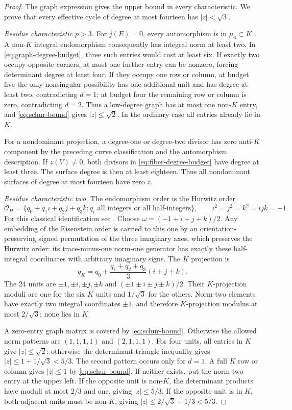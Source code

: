 \begin{proof}
The graph expression gives the upper bound in every characteristic.  We prove that every effective cycle of degree at most fourteen has $|z|<\sqrt3$.

\emph{Residue characteristic $p>3$.}
For $j(E)=0$, every automorphism is in $\mu_6\subset K$ \cite[Proposition IV.7.13]{MilneEC}.  A non-$K$ integral endomorphism consequently has integral norm at least two.  In \eqref{eq:graph-degree-budget}, three such entries would cost at least six.  If exactly two occupy opposite corners, at most one further entry can be nonzero, forcing determinant degree at least four.  If they occupy one row or column, at budget five the only nonsingular possibility has one additional unit and has degree at least two, contradicting $d=1$; at budget four the remaining row or column is zero, contradicting $d=2$.  Thus a low-degree graph has at most one non-$K$ entry, and \eqref{eq:schur-bound} gives $|z|\leq\sqrt2$.  In the ordinary case all entries already lie in $K$.

For a nondominant projection, a degree-one or degree-two divisor has zero anti-$K$ component by the preceding curve classification and the automorphism description.  If $z(V)\ne0$, both divisors in \eqref{eq:fiber-degree-budget} have degree at least three.  The surface degree is then at least eighteen.  Thus all nondominant surfaces of degree at most fourteen have zero $z$.

\emph{Residue characteristic two.}
The endomorphism order is the Hurwitz order
\[
 \mathcal O_H=\{q_0+q_1i+q_2j+q_3k:
  q_i\text{ all integers or all half-integers}\},
 \qquad i^2=j^2=k^2=ijk=-1.
\]
For this classical identification see \cite[footnote 2]{CHVW2022}.
Choose $\omega=(-1+i+j+k)/2$.  Any embedding of the Eisenstein order is carried to this one by an orientation-preserving signed permutation of the three imaginary axes, which preserves the Hurwitz order: its trace-minus-one norm-one generator has exactly these half-integral coordinates with arbitrary imaginary signs.  The $K$ projection is
\[
 q_K=q_0+\frac{q_1+q_2+q_3}{3}(i+j+k).
\]
The 24 units are $\pm1,\pm i,\pm j,\pm k$ and $(\pm1\pm i\pm j\pm k)/2$.  Their $K$-projection moduli are one for the six $K$ units and $1/\sqrt3$ for the others.  Norm-two elements have exactly two integral coordinates $\pm1$, and therefore $K$-projection modulus at most $2/\sqrt3$; none lies in $K$.

A zero-entry graph matrix is covered by \eqref{eq:schur-bound}.  Otherwise the allowed norm patterns are $(1,1,1,1)$ and $(2,1,1,1)$.  For four units, all entries in $K$ give $|z|\leq\sqrt2$; otherwise the determinant triangle inequality gives $|z|\leq1+1/\sqrt3<5/3$.
The second pattern occurs only for $d=1$.  A full $K$ row or column gives $|z|\leq1$ by \eqref{eq:schur-bound}.  If neither exists, put the norm-two entry at the upper left.  If the opposite unit is non-$K$, the determinant products have moduli at most $2/3$ and one, giving $|z|\leq5/3$.  If the opposite unit is in $K$, both adjacent units must be non-$K$, giving $|z|\leq2/\sqrt3+1/3<5/3$.


\end{proof}
